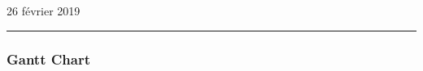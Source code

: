 \documentclass[12pt,a4paper]{report}
\newcommand{\HRule}{\rule{\linewidth}{0.5mm}} %
\begin{document}
{ \large 26 février 2019}\\[0.25cm]
\HRule

\newpage

\subsubsection{Gantt Chart}
\begin{figure}[!ht]
  \centering
  
\end{figure}
\end{document}
